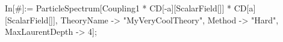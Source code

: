 In[#]:= ParticleSpectrum[Coupling1 * CD[-a][ScalarField[]] * CD[a][ScalarField[]], TheoryName -> "MyVeryCoolTheory", Method -> "Hard", MaxLaurentDepth -> 4]; 